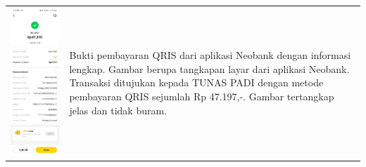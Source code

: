 \begin{table}[h!]
    \centering
    \begin{tabularx}{\textwidth}{m{} X}
        \includegraphics[width=\linewidth]{images/contoh-data/qris-3.jpg}
        & 
        Bukti pembayaran QRIS dari aplikasi Neobank dengan informasi lengkap. Gambar berupa tangkapan layar dari aplikasi Neobank. Transaksi ditujukan kepada TUNAS PADI dengan metode pembayaran QRIS sejumlah Rp 47.197,-. Gambar tertangkap jelas dan tidak buram. \\
    \end{tabularx}
\end{table}

